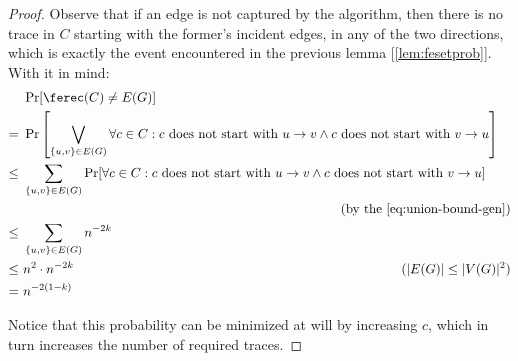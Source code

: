 \begin{proof}
    Observe that if an edge is not captured by the algorithm, then there is no trace in $C$ starting with the former's incident edges, in any of the two directions, which is exactly the event encountered in the previous lemma [\ref{lem:fesetprob}]. With it in mind:
    \begin{align*}
            &\ \Pr[\ferec(C) \neq E(G)]         & \\
           =&\ \Pr \left[ \bigvee_{\{u, v\} \in E(G)} \forall c \in C : c \text{ does not start with } u \to v \wedge c \text{ does not start with } v \to u \right] & \\
        \leq&\ \sum_{\{u,v\} \in E(G)} \Pr[\forall c \in C : c \text{ does not start with } u \to v \wedge c \text{ does not start with } v \to u] & \\
            &                                   & \mathllap{\text{(by the \ref{eq:union-bound-gen})}} \\
        \leq&\ \sum_{\{u,v\} \in E(G)} n^{-2 k} & \\
        \leq&\ n^2 \cdot n^{-2 k}               & \mathllap{(|E(G)| \leq |V(G)|^2)} \\
           =&\ n^{-2(1 - k)}                    & \\
    \end{align*}
    
    Notice that this probability can be minimized at will by increasing $c$, which in turn increases the number of required traces.
    
\end{proof}
